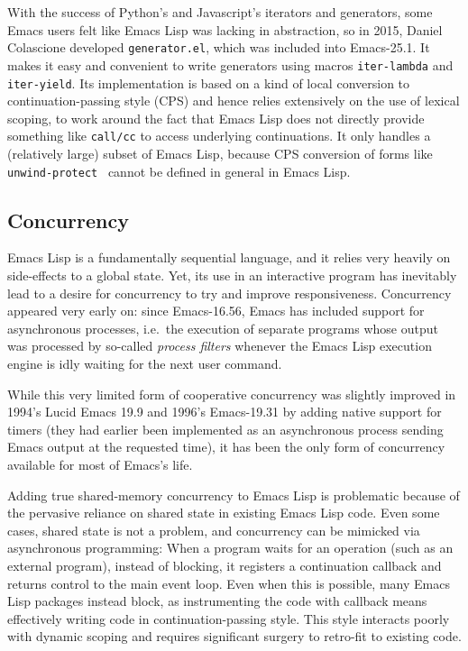 \documentclass[format=acmsmall, review]{acmart}
\newcommand \Elisp {Emacs Lisp}
\begin{document}
With the success of Python's and Javascript's iterators and generators, some
Emacs users felt like \Elisp{} was lacking in abstraction, so in 2015,
Daniel Colascione developed \texttt{generator.el}, which was included
into Emacs-25.1.  It makes it easy and convenient to write generators using
macros \texttt{iter-lambda} and \texttt{iter-yield}.  Its implementation is
based on a kind of local conversion to continuation-passing style (CPS) and
hence relies extensively on the use of lexical scoping, to work around the
fact that \Elisp{} does not directly provide something like \texttt{call/cc}
to access underlying continuations.  It only handles a (relatively large)
subset of \Elisp{}, because CPS conversion of forms like
\texttt{unwind-protect}~\cite{HaynesFriedman1987} cannot be defined in general in \Elisp.

\subsection{Concurrency}
\label{sec:concurrency}

\Elisp{} is a fundamentally sequential language, and it relies very heavily
on side-effects to a global state.  Yet, its use in an interactive program
has inevitably lead to a desire for concurrency to try and improve
responsiveness.  Concurrency appeared very early on: since
Emacs-16.56, Emacs has included support for asynchronous processes, i.e.~the
execution of separate programs whose output was processed by so-called
\emph{process filters} whenever the \Elisp{} execution engine is idly
waiting for the next user command.

While this very limited form of cooperative concurrency was slightly
improved in 1994's Lucid Emacs 19.9 and 1996's Emacs-19.31 by adding native support for timers (they
had earlier been implemented as an asynchronous process sending Emacs output at
the requested time), it has been the only form of concurrency available for
most of Emacs's life.

Adding true shared-memory concurrency to \Elisp{} is problematic
because of the pervasive reliance on shared state in existing \Elisp{}
code.  Even some cases, shared state is not a problem, and concurrency
can be mimicked via asynchronous programming: When a program waits for
an operation (such as an external program), instead of blocking, it
registers a continuation callback and returns control to the main
event loop.  Even when this is possible, many \Elisp{} packages 
instead block, as instrumenting the code with callback means
effectively writing code in continuation-passing style.  This style
interacts poorly with dynamic scoping and requires significant surgery
to retro-fit to existing code.
\end{document}
